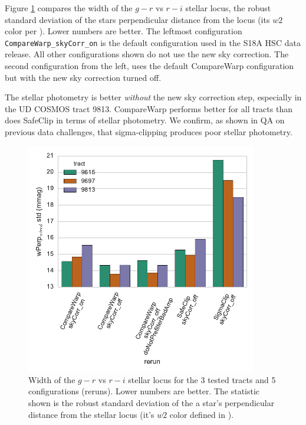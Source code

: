 \documentclass[DM,authoryear,toc]{lsstdoc}
\begin{document}
Figure \ref{fig:w_std_fit} compares the width of the $g-r$ vs $r-i$ stellar locus,  the robust standard deviation of the stars perpendicular distance from the locus (its $w2$ color per \cite{Ivezic2004b}).
Lower numbers are better.
The leftmost configuration \texttt{CompareWarp\_skyCorr\_on} is the default configuration used in the S18A HSC data release.
All other configurations shown do not use the new sky correction.
The second configuration from the left, uses the default CompareWarp configuration but with the new sky correction turned off.

The stellar photometry is better \emph{without} the new sky correction step, especially in the UD COSMOS tract 9813.
CompareWarp performs better for all tracts than does SafeClip in terms of stellar photometry.
We confirm, as shown in QA on previous data challenges, that sigma-clipping produces poor stellar photometry.

\begin{figure}
\begin{centering}
\includegraphics[width=0.9\textwidth]{figures/w_std_fit.pdf}
\par\end{centering}
\caption{\label{fig:w_std_fit} Width of the $g-r$ vs $r-i$ stellar locus for the 3 tested tracts and 5 configurations (reruns). Lower numbers are better. The statistic shown is the robust standard deviation of the a star's perpendicular distance from the stellar locus (it's $w2$ color defined in \cite{Ivezic2004b}). }
\end{figure}
\end{document}
